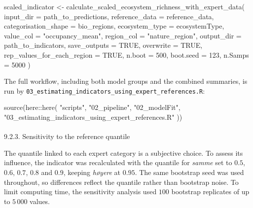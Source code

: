 \documentclass[
  letterpaper,
  DIV=11,
  numbers=noendperiod]{scrartcl}
\makeatletter
\let\oldparagraph\paragraph
\renewcommand{\paragraph}{
    \@ifstar
      \xxxParagraphStar
      \xxxParagraphNoStar
  }
\newcommand{\xxxParagraphStar}[1]{\oldparagraph*{#1}\mbox{}}
\newcommand{\xxxParagraphNoStar}[1]{\oldparagraph{#1}\mbox{}}
\newenvironment{Shaded}{\begin{snugshade}}{\end{snugshade}}
\newcommand{\AttributeTok}[1]{\textcolor[rgb]{0.40,0.45,0.13}{#1}}
\newcommand{\ConstantTok}[1]{\textcolor[rgb]{0.56,0.35,0.01}{#1}}
\newcommand{\DecValTok}[1]{\textcolor[rgb]{0.68,0.00,0.00}{#1}}
\newcommand{\FunctionTok}[1]{\textcolor[rgb]{0.28,0.35,0.67}{#1}}
\newcommand{\NormalTok}[1]{\textcolor[rgb]{0.00,0.23,0.31}{#1}}
\newcommand{\OtherTok}[1]{\textcolor[rgb]{0.00,0.23,0.31}{#1}}
\newcommand{\SpecialCharTok}[1]{\textcolor[rgb]{0.37,0.37,0.37}{#1}}
\newcommand{\StringTok}[1]{\textcolor[rgb]{0.13,0.47,0.30}{#1}}
\makeatother
\begin{document}
\begin{Shaded}
\begin{Highlighting}[]
\NormalTok{scaled\_indicator }\OtherTok{\textless{}{-}} \FunctionTok{calculate\_scaled\_ecosystem\_richness\_with\_expert\_data}\NormalTok{(}
  \AttributeTok{input\_dir =}\NormalTok{ path\_to\_predictions,}
  \AttributeTok{reference\_data =}\NormalTok{ reference\_data,}
  \AttributeTok{categorisation\_shape =}\NormalTok{ bio\_regions,}
  \AttributeTok{ecosystem\_type =}\NormalTok{ ecosystemType,}
  \AttributeTok{value\_col =} \StringTok{"occupancy\_mean"}\NormalTok{,}
  \AttributeTok{region\_col =} \StringTok{"nature\_region"}\NormalTok{,}
  \AttributeTok{output\_dir =}\NormalTok{ path\_to\_indicators,}
  \AttributeTok{save\_outputs =} \ConstantTok{TRUE}\NormalTok{,}
  \AttributeTok{overwrite =} \ConstantTok{TRUE}\NormalTok{,}
  \AttributeTok{rep\_values\_for\_each\_region =} \ConstantTok{TRUE}\NormalTok{,}
  \AttributeTok{n.boot =} \DecValTok{500}\NormalTok{,}
  \AttributeTok{boot.seed =} \DecValTok{123}\NormalTok{,}
  \AttributeTok{n.Samps =} \DecValTok{5000}
\NormalTok{)}
\end{Highlighting}
\end{Shaded}

The full workflow, including both model groups and the combined
summaries, is run by
\texttt{03\_estimating\_indicators\_using\_expert\_references.R}:

\begin{Shaded}
\begin{Highlighting}[]
\FunctionTok{source}\NormalTok{(here}\SpecialCharTok{::}\FunctionTok{here}\NormalTok{(}
  \StringTok{"scripts"}\NormalTok{,}
  \StringTok{"02\_pipeline"}\NormalTok{,}
  \StringTok{"02\_modelFit"}\NormalTok{,}
  \StringTok{"03\_estimating\_indicators\_using\_expert\_references.R"}
\NormalTok{))}
\end{Highlighting}
\end{Shaded}

\paragraph{9.2.3. Sensitivity to the reference
quantile}\label{sensitivity-to-the-reference-quantile}

The quantile linked to each expert category is a subjective choice. To
assess its influence, the indicator was recalculated with the quantile
for \emph{samme} set to \(0.5\), \(0.6\), \(0.7\), \(0.8\) and \(0.9\),
keeping \emph{høyere} at \(0.95\). The same bootstrap seed was used
throughout, so differences reflect the quantile rather than bootstrap
noise. To limit computing time, the sensitivity analysis used \(100\)
bootstrap replicates of up to \(5\,000\) values.
\end{document}
